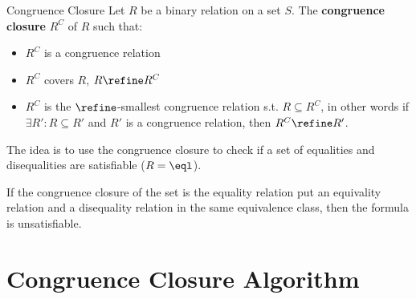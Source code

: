 \begin{definition}{Congruence Closure}
    Let $R$ be a binary relation on a set $S$.
    The \textbf{congruence closure} $R^C$ of $R$ such that:   
    \begin{itemize}
        \item $R^C$ is a congruence relation
        \item $R^C$ covers $R$, $R \refine R^C$
        \item $R^C$ is the $\refine$-smallest congruence relation 
        s.t. $R \subseteq R^C$, in other words
        if $\exists R': R \subseteq R'$ and $R'$ is a congruence relation, 
        then $R^C \refine R'$.    
    \end{itemize}
\end{definition}

The idea is to use the congruence closure to check if a set of equalities and disequalities
are satisfiable ($R = \eql$).

If the congruence closure of the set is the equality relation put 
an equivality relation and a disequality relation in the same 
equivalence class, then the formula is unsatisfiable.

\section{Congruence Closure Algorithm}
\label{sec:Congruence Closure Algorithm}